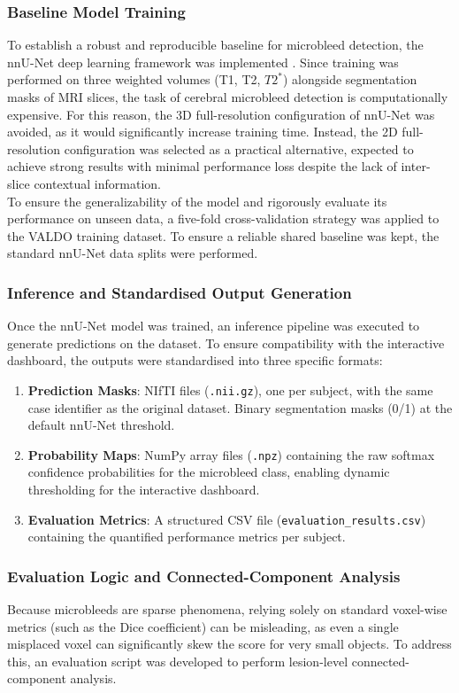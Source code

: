 \documentclass{aifyp}
\begin{document}
\subsubsection{Baseline Model Training}
To establish a robust and reproducible baseline for microbleed detection, the nnU-Net deep learning framework was implemented \cite{nnUNet}. Since training was performed on three weighted volumes (T1, T2, $T2^*$) alongside segmentation masks of MRI slices, the task of cerebral microbleed detection is computationally expensive. For this reason, the 3D full-resolution configuration of nnU-Net was avoided, as it would significantly increase training time. Instead, the 2D full-resolution configuration was selected as a practical alternative, expected to achieve strong results with minimal performance loss despite the lack of inter-slice contextual information.
\\

To ensure the generalizability of the model and rigorously evaluate its performance on unseen data, a five-fold cross-validation strategy was applied to the VALDO training dataset. To ensure a reliable shared baseline was kept, the standard nnU-Net data splits were performed.

\subsubsection{Inference and Standardised Output Generation}
Once the nnU-Net model was trained, an inference pipeline was executed to generate predictions on the dataset. To ensure compatibility with the interactive dashboard, the outputs were standardised into three specific formats:
\begin{enumerate}
    \item \textbf{Prediction Masks}: NIfTI files (\texttt{.nii.gz}), one per subject, with the same case identifier as the original dataset. Binary segmentation masks (0/1) at the default nnU-Net threshold.
    \item \textbf{Probability Maps}: NumPy array files (\texttt{.npz}) containing the raw softmax confidence probabilities for the microbleed class, enabling dynamic thresholding for the interactive dashboard.
    \item \textbf{Evaluation Metrics}: A structured CSV file (\texttt{evaluation\_results.csv}) containing the quantified performance metrics per subject.
\end{enumerate}

\subsubsection{Evaluation Logic and Connected-Component Analysis}
\label{ss:eval}
Because microbleeds are sparse phenomena, relying solely on standard voxel-wise metrics (such as the Dice coefficient) can be misleading, as even a single misplaced voxel can significantly skew the score for very small objects. To address this, an evaluation script was developed to perform lesion-level connected-component analysis.
\\
\end{document}
